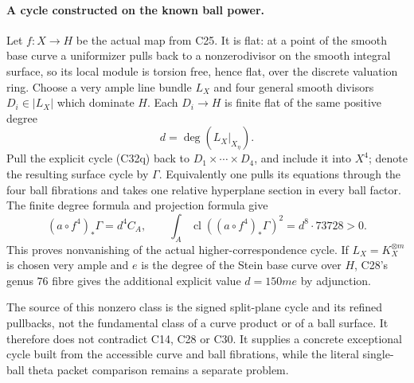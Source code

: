 \documentclass[11pt]{article}
\theoremstyle{definition}\newtheorem{definition}[theorem]{Definition}\newtheorem{remark}[theorem]{Remark}
\begin{document}
\paragraph{A cycle constructed on the known ball power.}
Let $f:X\to H$ be the actual map from
C25.  It is flat: at a point of the
smooth base curve a uniformizer pulls
back to a nonzerodivisor on the smooth
integral surface, so its local module
is torsion free, hence flat, over the
discrete valuation ring.  Choose a very
ample line bundle $L_X$ and four general
smooth divisors $D_i\in|L_X|$ which
dominate $H$.  Each $D_i\to H$ is finite
flat of the same positive degree
\[
                       d=\deg(L_X|_{X_\eta}).
\]
Pull the explicit cycle (C32q) back to
$D_1\times\cdots\times D_4$, and include
it into $X^4$; denote the resulting
surface cycle by $\Gamma$.  Equivalently
one pulls its equations through the four
ball fibrations and takes one relative
hyperplane section in every ball factor.
The finite degree formula and projection
formula give
\[
       (a\circ f^4)_*\Gamma=d^4 C_A,
 \qquad
       \int_A\operatorname{cl}((a\circ f^4)_*\Gamma)^2
                                      =d^8\cdot73728>0.
                                                        \tag{C32t}
\]
This proves nonvanishing of the actual
higher-correspondence cycle.  If
$L_X=K_X^{\otimes m}$ is chosen very
ample and $e$ is the degree of the
Stein base curve over $H$, C28's genus
$76$ fibre gives the additional explicit
value $d=150me$ by adjunction.

The source of this nonzero class is the
signed split-plane cycle and its refined
pullbacks, not the fundamental class of
a curve product or of a ball surface.
It therefore does not contradict C14,
C28 or C30.  It supplies a concrete
exceptional cycle built from the
accessible curve and ball fibrations,
while the literal single-ball theta
packet comparison remains a separate
problem.
\end{document}

